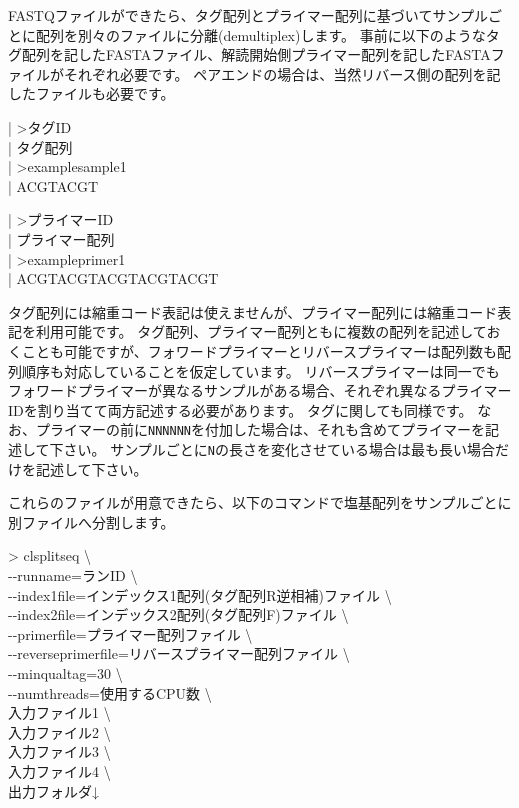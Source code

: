 \documentclass[titlepage,10pt,a4paper]{jsbook}
\newenvironment{content}{\begin{shaded}\vspace{-1em}\raggedright\ttfamily\footnotesize\setlength{\baselineskip}{1.4em}}{\end{shaded}\vspace{-1em}}
\newenvironment{cmd}{\begin{oframed}\raggedright\ttfamily\footnotesize\setlength{\baselineskip}{1.4em}}{\end{oframed}\vspace{-1em}}
\begin{document}
FASTQファイルができたら、タグ配列とプライマー配列に基づいてサンプルごとに配列を別々のファイルに分離(demultiplex)します。
事前に以下のようなタグ配列を記したFASTAファイル、解読開始側プライマー配列を記したFASTAファイルがそれぞれ必要です。
ペアエンドの場合は、当然リバース側の配列を記したファイルも必要です。

\begin{content}
| {\textgreater}タグID\\
| タグ配列\\
| {\textgreater}examplesample1\\
| ACGTACGT
\end{content}

\begin{content}
| {\textgreater}プライマーID\\
| プライマー配列\\
| {\textgreater}exampleprimer1\\
| ACGTACGTACGTACGTACGT
\end{content}

タグ配列には縮重コード表記は使えませんが、プライマー配列には縮重コード表記を利用可能です。
タグ配列、プライマー配列ともに複数の配列を記述しておくことも可能ですが、フォワードプライマーとリバースプライマーは配列数も配列順序も対応していることを仮定しています。
リバースプライマーは同一でもフォワードプライマーが異なるサンプルがある場合、それぞれ異なるプライマーIDを割り当てて両方記述する必要があります。
タグに関しても同様です。
なお、プライマーの前に\texttt{NNNNNN}を付加した場合は、それも含めてプライマーを記述して下さい。
サンプルごとに\texttt{N}の長さを変化させている場合は最も長い場合だけを記述して下さい。

これらのファイルが用意できたら、以下のコマンドで塩基配列をサンプルごとに別ファイルへ分割します。

\begin{cmd}
{\textgreater} clsplitseq {\textbackslash}\\
{-}{-}runname=ランID {\textbackslash}\\
{-}{-}index1file=インデックス1配列(タグ配列R逆相補)ファイル {\textbackslash}\\
{-}{-}index2file=インデックス2配列(タグ配列F)ファイル {\textbackslash}\\
{-}{-}primerfile=プライマー配列ファイル {\textbackslash}\\
{-}{-}reverseprimerfile=リバースプライマー配列ファイル {\textbackslash}\\
{-}{-}minqualtag=30 {\textbackslash}\\
{-}{-}numthreads=使用するCPU数 {\textbackslash}\\
入力ファイル1 {\textbackslash}\\
入力ファイル2 {\textbackslash}\\
入力ファイル3 {\textbackslash}\\
入力ファイル4 {\textbackslash}\\
出力フォルダ↓
\end{cmd}
\end{document}
